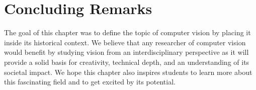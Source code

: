 \section{Concluding Remarks}

The goal of this chapter was to define the topic of computer vision by placing it inside its historical context. We believe that any researcher of computer vision would benefit by studying vision from an interdisciplinary perspective as it will provide a solid basis for creativity, technical depth, and an understanding of its societal impact. We hope this chapter also inspires students to learn more about this fascinating field and to get excited by its potential.


